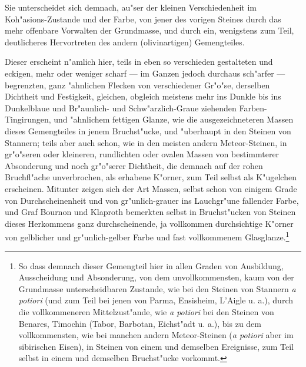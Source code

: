 \documentclass[a4paper, 11pt, oneside, german]{article}
\begin{document}
Sie unterscheidet sich demnach, au"ser der kleinen Verschiedenheit im Koh"asions-Zustande und der Farbe, von jener des vorigen Steines durch das mehr offenbare Vorwalten der Grundmasse, und durch ein, wenigstens zum Teil, deutlicheres Hervortreten des andern (olivinartigen) Gemengteiles.

Dieser erscheint n"amlich hier, teils in eben so verschieden gestalteten und eckigen, mehr oder weniger scharf --- im Ganzen jedoch durchaus sch"arfer --- begrenzten, ganz "ahnlichen Flecken von verschiedener Gr"o"se, derselben Dichtheit und Festigkeit, gleichen, obgleich meistens mehr ins Dunkle bis ins Dunkelblaue und Br"aunlich- und Schw"arzlich-Graue ziehenden Farben-Tingirungen, und "ahnlichem fettigen Glanze, wie die ausgezeichneteren Massen dieses Gemengteiles in jenem Bruchst"ucke, und "uberhaupt in den Steinen von Stannern; teils aber auch schon, wie in den meisten andern Meteor-Steinen, in gr"o"seren oder kleineren, rundlichten oder ovalen Massen von bestimmterer Absonderung und noch gr"o"serer Dichtheit, die demnach auf der rohen Bruchfl"ache unverbrochen, als erhabene K"orner, zum Teil selbst als K"ugelchen erscheinen. Mitunter zeigen sich der Art Massen, selbst schon von einigem Grade von Durchscheinenheit und von gr"unlich-grauer ins Lauchgr"une fallender Farbe, und Graf Bournon und Klaproth bemerkten selbst in Bruchst"ucken von Steinen dieses Herkommens ganz durchscheinende, ja vollkommen durchsichtige K"orner von gelblicher und gr"unlich-gelber Farbe und fast vollkommenem Glasglanze.\footnote{So dass demnach dieser Gemengteil hier in allen Graden von Ausbildung, Ausscheidung und Absonderung, von dem unvollkommensten, kaum von der Grundmasse unterscheidbaren Zustande, wie bei den Steinen von Stannern \emph{a potiori} (und zum Teil bei jenen von Parma, Ensisheim, L'Aigle u. a.), durch die vollkommeneren Mittelzust"ande, wie \emph{a potiori} bei den Steinen von Benares, Timochin (Tabor, Barbotan, Eichst"adt u. a.), bis zu dem vollkommensten, wie bei manchen andern Meteor-Steinen (\emph{a potiori} aber im sibirischen Eisen), in Steinen von einem und demselben Ereignisse, zum Teil selbst in einem und demselben Bruchst"ucke vorkommt.}
\end{document}
